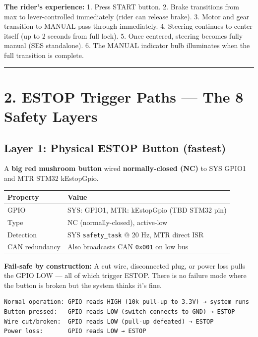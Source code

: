 \documentclass[12pt,a4paper,oneside]{report}
\begin{document}
\textbf{The rider's experience:} 1. Press START button. 2. Brake transitions
from max to lever-controlled immediately (rider can release brake). 3. Motor and
gear transition to MANUAL pass-through immediately. 4. Steering continues to
center itself (up to 2 seconds from full lock). 5. Once centered, steering
becomes fully manual (SES standalone). 6. The MANUAL indicator bulb
illuminates when the full transition is complete.

\begin{center}\rule{0.5\linewidth}{0.5pt}\end{center}

\section{2. ESTOP Trigger Paths --- The 8 Safety
Layers}\label{estop-trigger-paths-the-8-safety-layers}

\subsection{Layer 1: Physical ESTOP Button
(fastest)}\label{layer-1-physical-estop-button-fastest}

A \textbf{big red mushroom button} wired \textbf{normally-closed (NC)} to SYS
GPIO1 and MTR STM32 kEstopGpio.

\begin{longtable}[]{@{}ll@{}}
\toprule\noalign{}
Property & Value \\
\midrule\noalign{}
\endhead
\bottomrule\noalign{}
\endlastfoot
GPIO & SYS: GPIO1, MTR: kEstopGpio (TBD STM32 pin) \\
Type & NC (normally-closed), active-low \\
Detection & SYS \texttt{safety\_task} @ 20 Hz, MTR direct ISR \\
CAN redundancy & Also broadcasts CAN \texttt{0x001} on low bus \\
\end{longtable}

\textbf{Fail-safe by construction:} A cut wire, disconnected plug, or power loss
pulls the GPIO LOW --- all of which trigger ESTOP. There is no failure mode
where the button is broken but the system thinks it's fine.

\begin{verbatim}
Normal operation: GPIO reads HIGH (10k pull-up to 3.3V) → system runs
Button pressed:   GPIO reads LOW (switch connects to GND) → ESTOP
Wire cut/broken:  GPIO reads LOW (pull-up defeated) → ESTOP
Power loss:       GPIO reads LOW → ESTOP
\end{verbatim}
\end{document}
